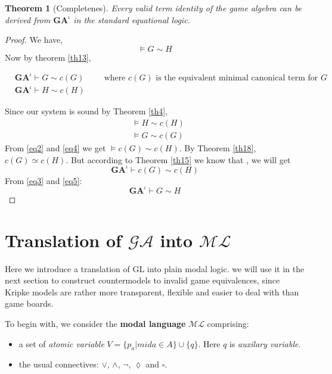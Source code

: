 \documentclass[10pt]{article}
\newcommand{\move}{\lozenge}
\newcommand{\Move}{\square}
\newcommand{\ml}{\mathcal{ML}}
\newcommand{\ga}{\mathcal{GA}}
\newcommand{\id}{\iota}
\newtheorem{theorem}{Theorem}
\begin{document}
		\begin{theorem}[Completenes]
			Every valid term identity of the game algebra can be derived from $\textbf{GA}^\id$ in the standard equational logic.
		\end{theorem}
		\begin{proof}
		We have,
		\begin{equation}\label{eq2}
			\models G \sim H
		\end{equation}
		 Now by theorem \ref{th13}, 
		
		 \begin{equation} \label{eq3}
		 	\begin{split}
		 	& \textbf{GA}^\id \vdash G \sim c(G) \hspace{1cm}\text{where $c(G)$ is the equivalent minimal canonical term for $G$}\\ 
		 	& \textbf{GA}^\id \vdash H \sim c(H)
		 	\end{split}
		 \end{equation}
		 
		 Since our system is sound by Theorem \ref{th4}, 
		 \begin{equation}
		 	\begin{split}
		 		&\models  H \sim c(H) \label{eq4}\\		
		 		&\models G \sim c(G) 
		 	\end{split}
		 \end{equation}
		  From \ref{eq2} and \ref{eq4} we get $\models c(G) \sim c(H)$. By Theorem \ref{th18}, $c(G) \simeq c(H)$. But according to Theorem \ref{th15} we know that , we will get
		  \begin{equation}\label{eq5}
		  	\textbf{GA}^\id \vdash c(G) \sim c(H)
		  \end{equation}
		  From \ref{eq3} and \ref{eq5}:
		  \[
		  	\textbf{GA}^\id \vdash G \sim H
		  \]
		\end{proof}
		
		\section{Translation of $\ga$ into $\ml$}
		Here we introduce a translation of GL into plain modal logic. we will use it in the next section to construct countermodels to invalid game equivalences, since Kripke models are rather more transparent, flexible and easier to deal with than game boards.
		
		To begin with, we consider the \textbf{modal language} $\ml$ comprising:
		\begin{itemize}
			\item a set of \textit{atomic variable} $V =\{p_a|mid a\in A\} \cup \{q\}$. Here $q$ is \textit{auxilary variable}.
			
			\item the usual connectives: $\lor$, $\land$, $\neg$, $\move$ and $\Move$.
		\end{itemize}
		
\end{document}
